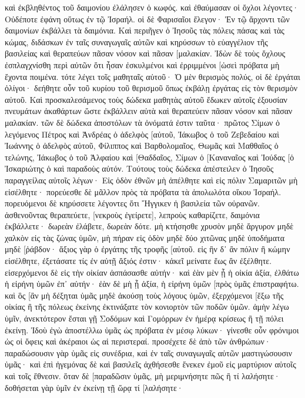 καὶ ἐκβληθέντος τοῦ δαιμονίου ἐλάλησεν ὁ κωφός. καὶ ἐθαύμασαν οἱ ὄχλοι λέγοντες· Οὐδέποτε ἐφάνη οὕτως ἐν τῷ Ἰσραήλ. 
οἱ δὲ Φαρισαῖοι ἔλεγον· Ἐν τῷ ἄρχοντι τῶν δαιμονίων ἐκβάλλει τὰ δαιμόνια. 
Καὶ περιῆγεν ὁ Ἰησοῦς τὰς πόλεις πάσας καὶ τὰς κώμας, διδάσκων ἐν ταῖς συναγωγαῖς αὐτῶν καὶ κηρύσσων τὸ εὐαγγέλιον τῆς βασιλείας καὶ θεραπεύων πᾶσαν νόσον καὶ πᾶσαν [μαλακίαν. 
Ἰδὼν δὲ τοὺς ὄχλους ἐσπλαγχνίσθη περὶ αὐτῶν ὅτι ἦσαν ἐσκυλμένοι καὶ ἐρριμμένοι [ὡσεὶ πρόβατα μὴ ἔχοντα ποιμένα. 
τότε λέγει τοῖς μαθηταῖς αὐτοῦ· Ὁ μὲν θερισμὸς πολύς, οἱ δὲ ἐργάται ὀλίγοι· 
δεήθητε οὖν τοῦ κυρίου τοῦ θερισμοῦ ὅπως ἐκβάλῃ ἐργάτας εἰς τὸν θερισμὸν αὐτοῦ. 
Καὶ προσκαλεσάμενος τοὺς δώδεκα μαθητὰς αὐτοῦ ἔδωκεν αὐτοῖς ἐξουσίαν πνευμάτων ἀκαθάρτων ὥστε ἐκβάλλειν αὐτὰ καὶ θεραπεύειν πᾶσαν νόσον καὶ πᾶσαν μαλακίαν. 
τῶν δὲ δώδεκα ἀποστόλων τὰ ὀνόματά ἐστιν ταῦτα· πρῶτος Σίμων ὁ λεγόμενος Πέτρος καὶ Ἀνδρέας ὁ ἀδελφὸς [αὐτοῦ, Ἰάκωβος ὁ τοῦ Ζεβεδαίου καὶ Ἰωάννης ὁ ἀδελφὸς αὐτοῦ, 
Φίλιππος καὶ Βαρθολομαῖος, Θωμᾶς καὶ Μαθθαῖος ὁ τελώνης, Ἰάκωβος ὁ τοῦ Ἁλφαίου καὶ [Θαδδαῖος, 
Σίμων ὁ [Καναναῖος καὶ Ἰούδας [ὁ Ἰσκαριώτης ὁ καὶ παραδοὺς αὐτόν. 
Τούτους τοὺς δώδεκα ἀπέστειλεν ὁ Ἰησοῦς παραγγείλας αὐτοῖς λέγων· Εἰς ὁδὸν ἐθνῶν μὴ ἀπέλθητε καὶ εἰς πόλιν Σαμαριτῶν μὴ εἰσέλθητε· 
πορεύεσθε δὲ μᾶλλον πρὸς τὰ πρόβατα τὰ ἀπολωλότα οἴκου Ἰσραήλ. 
πορευόμενοι δὲ κηρύσσετε λέγοντες ὅτι Ἤγγικεν ἡ βασιλεία τῶν οὐρανῶν. 
ἀσθενοῦντας θεραπεύετε, [νεκροὺς ἐγείρετε], λεπροὺς καθαρίζετε, δαιμόνια ἐκβάλλετε· δωρεὰν ἐλάβετε, δωρεὰν δότε. 
μὴ κτήσησθε χρυσὸν μηδὲ ἄργυρον μηδὲ χαλκὸν εἰς τὰς ζώνας ὑμῶν, 
μὴ πήραν εἰς ὁδὸν μηδὲ δύο χιτῶνας μηδὲ ὑποδήματα μηδὲ [ῥάβδον· ἄξιος γὰρ ὁ ἐργάτης τῆς τροφῆς [αὐτοῦ. 
εἰς ἣν δ᾽ ἂν πόλιν ἢ κώμην εἰσέλθητε, ἐξετάσατε τίς ἐν αὐτῇ ἄξιός ἐστιν· κἀκεῖ μείνατε ἕως ἂν ἐξέλθητε. 
εἰσερχόμενοι δὲ εἰς τὴν οἰκίαν ἀσπάσασθε αὐτήν· 
καὶ ἐὰν μὲν ᾖ ἡ οἰκία ἀξία, ἐλθάτω ἡ εἰρήνη ὑμῶν ἐπ᾽ αὐτήν· ἐὰν δὲ μὴ ᾖ ἀξία, ἡ εἰρήνη ὑμῶν [πρὸς ὑμᾶς ἐπιστραφήτω. 
καὶ ὃς [ἂν μὴ δέξηται ὑμᾶς μηδὲ ἀκούσῃ τοὺς λόγους ὑμῶν, ἐξερχόμενοι [ἔξω τῆς οἰκίας ἢ τῆς πόλεως ἐκείνης ἐκτινάξατε τὸν κονιορτὸν τῶν ποδῶν ὑμῶν. 
ἀμὴν λέγω ὑμῖν, ἀνεκτότερον ἔσται γῇ Σοδόμων καὶ Γομόρρων ἐν ἡμέρᾳ κρίσεως ἢ τῇ πόλει ἐκείνῃ. 
Ἰδοὺ ἐγὼ ἀποστέλλω ὑμᾶς ὡς πρόβατα ἐν μέσῳ λύκων· γίνεσθε οὖν φρόνιμοι ὡς οἱ ὄφεις καὶ ἀκέραιοι ὡς αἱ περιστεραί. 
προσέχετε δὲ ἀπὸ τῶν ἀνθρώπων· παραδώσουσιν γὰρ ὑμᾶς εἰς συνέδρια, καὶ ἐν ταῖς συναγωγαῖς αὐτῶν μαστιγώσουσιν ὑμᾶς· 
καὶ ἐπὶ ἡγεμόνας δὲ καὶ βασιλεῖς ἀχθήσεσθε ἕνεκεν ἐμοῦ εἰς μαρτύριον αὐτοῖς καὶ τοῖς ἔθνεσιν. 
ὅταν δὲ [παραδῶσιν ὑμᾶς, μὴ μεριμνήσητε πῶς ἢ τί λαλήσητε· δοθήσεται γὰρ ὑμῖν ἐν ἐκείνῃ τῇ ὥρᾳ τί [λαλήσητε· 
